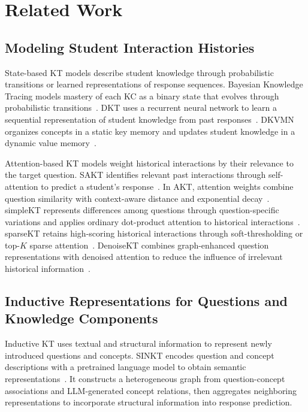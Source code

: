 \documentclass{llncs}
\begin{document}
\section{Related Work}

\subsection{Modeling Student Interaction Histories}

State-based KT models describe student knowledge through probabilistic transitions or learned representations of response sequences. Bayesian Knowledge Tracing models mastery of each KC as a binary state that evolves through probabilistic transitions~\cite{corbett1995knowledge}. DKT uses a recurrent neural network to learn a sequential representation of student knowledge from past responses~\cite{piech2015deep}. DKVMN organizes concepts in a static key memory and updates student knowledge in a dynamic value memory~\cite{zhang2017dynamic}.

Attention-based KT models weight historical interactions by their relevance to the target question. SAKT identifies relevant past interactions through self-attention to predict a student's response~\cite{pandey2019sakt}. In AKT, attention weights combine question similarity with context-aware distance and exponential decay~\cite{ghosh2020akt}. simpleKT represents differences among questions through question-specific variations and applies ordinary dot-product attention to historical interactions~\cite{liu2023simplekt}. sparseKT retains high-scoring historical interactions through soft-thresholding or top-$K$ sparse attention~\cite{huang2023sparsekt}. DenoiseKT combines graph-enhanced question representations with denoised attention to reduce the influence of irrelevant historical information~\cite{deng2025denoisekt}.

\subsection{Inductive Representations for Questions and Knowledge Components}

Inductive KT uses textual and structural information to represent newly introduced questions and concepts. SINKT encodes question and concept descriptions with a pretrained language model to obtain semantic representations~\cite{fu2024sinkt}. It constructs a heterogeneous graph from question-concept associations and LLM-generated concept relations, then aggregates neighboring representations to incorporate structural information into response prediction.
\end{document}
